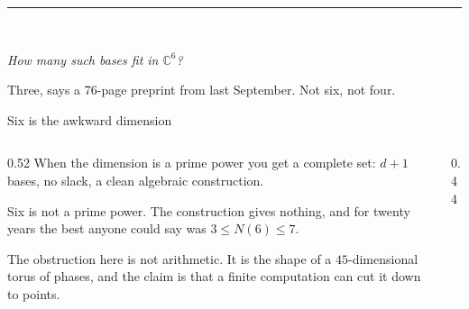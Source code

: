 \documentclass[aspectratio=169,11pt]{beamer}
\newcommand{\C}{\mathbb{C}}
\newcommand{\aside}[1]{{\color{faded}\small #1}}
\newcommand{\interlude}[2]{%
  \begin{frame}[plain]
    \vspace*{22mm}
    \begin{center}
      \begin{minipage}{0.86\textwidth}
        \centering
        {\color{ox}\rule{18mm}{1.2pt}}\\[6mm]
        {\LARGE\itshape #1\par}\vspace{5mm}
        {\color{faded}\normalsize #2\par}
      \end{minipage}
    \end{center}
  \end{frame}}
\begin{document}
\interlude{How many such bases
fit in $\C^6$?}{Three, says a 76-page preprint from last September.
Not six, not four.}

\begin{frame}{Six is the awkward dimension}
  \vspace{1mm}
  \begin{columns}[c]
  \begin{column}{0.52\textwidth}
    When the dimension is a prime power you get a complete set: $d+1$ bases, no slack, a clean
    algebraic construction.

    \vspace{4mm}
    Six is not a prime power. The construction gives nothing, and for twenty years the best anyone
    could say was $3\le N(6)\le 7$.

    \vspace{4mm}
    \aside{The obstruction here is not arithmetic. It is the shape of a $45$-dimensional torus of
    phases, and the claim is that a finite computation can cut it down to points.}
  \end{column}
  \begin{column}{0.44\textwidth}
    \centering
  \end{column}
  \end{columns}
\end{frame}
\end{document}
